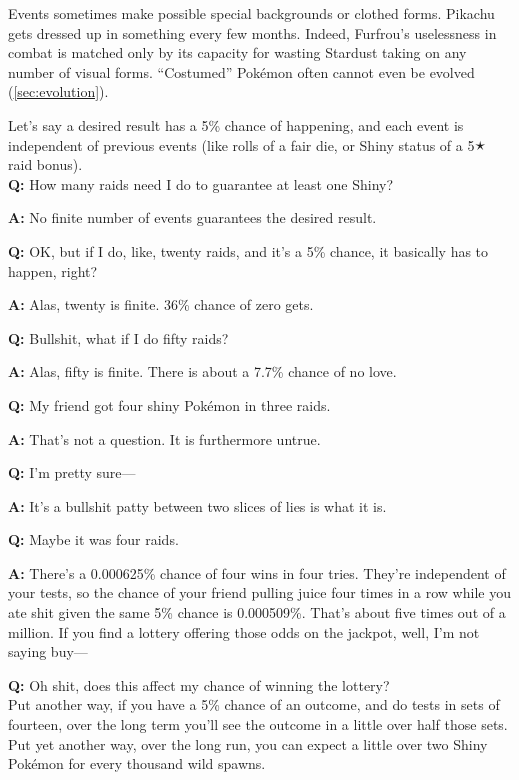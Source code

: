 Events sometimes make possible special backgrounds or clothed forms.
Pikachu gets dressed up in something every few months.
Indeed, Furfrou's uselessness in combat is matched only by its
  capacity for wasting Stardust taking on any number of visual forms.
``Costumed'' Pokémon often cannot even be evolved (\autoref{sec:evolution}).
\clearpage
\begin{tcolorbox}[enhanced,title=An aside regarding independent events,halign title=flush center]
Let's say a desired result has a 5\% chance of happening, and each event is independent of previous events (like rolls of a fair die, or Shiny status of a 5🟉 raid bonus).\\

\textbf{Q:} How many raids need I do to guarantee at least one Shiny?

\textbf{A:} No finite number of events guarantees the desired result.

\textbf{Q:} OK, but if I do, like, twenty raids, and it's a 5\% chance, it basically has to happen, right?

\textbf{A:} Alas, twenty is finite. 36\% chance of zero gets.

\textbf{Q:} Bullshit, what if I do fifty raids?

\textbf{A:} Alas, fifty is finite. There is about a 7.7\% chance of no love.

\textbf{Q:} My friend got four shiny Pokémon in three raids.

\textbf{A:} That's not a question. It is furthermore untrue.

\textbf{Q:} I'm pretty sure---

\textbf{A:} It's a bullshit patty between two slices of lies is what it is.

\textbf{Q:} Maybe it was four raids.

\textbf{A:} There's a 0.000625\% chance of four wins in four tries. They're independent of your tests,
             so the chance of your friend pulling juice four times in a row while you ate shit given
             the same 5\% chance is 0.000509\%. That's about five times out of a million.
             If you find a lottery offering those odds on the jackpot, well, I'm not saying buy---

\textbf{Q:} Oh shit, does this affect my chance of winning the lottery?\\

Put another way, if you have a 5\% chance of an outcome, and do tests in sets of fourteen,
 over the long term you'll see the outcome in a little over half those sets.
Put yet another way, over the long run, you can expect a little over two Shiny
 Pokémon for every thousand wild spawns.\\


\end{tcolorbox}
